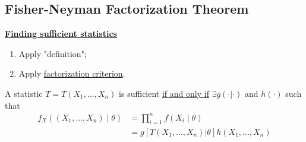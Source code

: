 \documentclass[11pt]{elegantbook}
\begin{document}
\subsection{Fisher-Neyman Factorization Theorem}
\textbf{\underline{Finding sufficient statistics}}
\begin{enumerate}[$\circ$]
    \item Apply "definition";
    \item Apply \underline{factorization criterion}.
\end{enumerate}

\begin{proposition}
    A statistic $T=T(X_1,...,X_n)$ is sufficient \underline{if and only if} $\exists g(\cdot|\cdot)$ and $h(\cdot)$ such that
    \begin{equation}
        \begin{aligned}
            f_X((X_1,...,X_n)\mid \theta)&=\prod_{i=1}^n f(X_i\mid \theta)\\
            &=g[T(X_1,...,X_n)| \theta] h(X_1,...,X_n)
        \end{aligned}
        \nonumber
    \end{equation}
\end{proposition}
\end{document}
